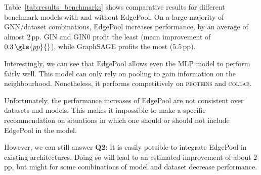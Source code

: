 \documentclass{article}
\newcommand{\tableref}[1]{Table~\ref{#1}}
\newcommand{\edgepool}{EdgePool}
\newcommand{\datasetname}[1]{\textsc{#1}}
\newcommand{\proteins}{\datasetname{proteins}}
\newcommand{\collab}{\datasetname{collab}}
\newcommand{\pp}{\,\gls{pp}}
\begin{document}
\tableref{tab:results_benchmarks} shows comparative results for different benchmark models with and without \edgepool{}. On a large majority of \gls{GNN}/dataset combinations, \edgepool{} increases performance, by an average of almost $2$\pp{}. GIN and GIN0 profit the least (mean improvement of $0.3\pp{}$), while GraphSAGE profits the most ($5.5$\pp{}).

Interestingly, we can see that \edgepool{} allows even the \gls{MLP} model to perform fairly well. This model can only rely on pooling to gain information on the neighbourhood. Nonetheless, it performs competitively on \proteins{} and \collab{}.

Unfortunately, the performance increases of \edgepool{} are not consistent over datasets and models. This makes it impossible to make a specific recommendation on situations in which one should or should not include \edgepool{} in the model.

However, we can still answer \textbf{Q2}: It is easily possible to integrate \edgepool{} in existing architectures. Doing so will lead to an estimated improvement of about $2$\pp{}, but might for some combinations of model and dataset decrease performance.
\end{document}
